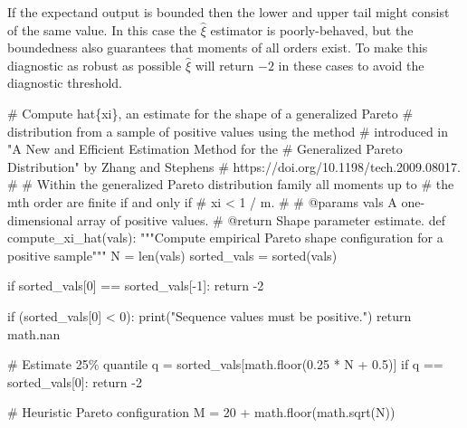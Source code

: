 \documentclass[
  letterpaper,
  DIV=11,
  numbers=noendperiod]{scrartcl}
\newenvironment{Shaded}{\begin{snugshade}}{\end{snugshade}}
\newcommand{\BuiltInTok}[1]{\textcolor[rgb]{0.00,0.23,0.31}{#1}}
\newcommand{\CommentTok}[1]{\textcolor[rgb]{0.37,0.37,0.37}{#1}}
\newcommand{\ControlFlowTok}[1]{\textcolor[rgb]{0.00,0.23,0.31}{#1}}
\newcommand{\DecValTok}[1]{\textcolor[rgb]{0.68,0.00,0.00}{#1}}
\newcommand{\FloatTok}[1]{\textcolor[rgb]{0.68,0.00,0.00}{#1}}
\newcommand{\KeywordTok}[1]{\textcolor[rgb]{0.00,0.23,0.31}{#1}}
\newcommand{\NormalTok}[1]{\textcolor[rgb]{0.00,0.23,0.31}{#1}}
\newcommand{\OperatorTok}[1]{\textcolor[rgb]{0.37,0.37,0.37}{#1}}
\newcommand{\StringTok}[1]{\textcolor[rgb]{0.13,0.47,0.30}{#1}}
\begin{document}
If the expectand output is bounded then the lower and upper tail might
consist of the same value. In this case the \(\hat{\xi}\) estimator is
poorly-behaved, but the boundedness also guarantees that moments of all
orders exist. To make this diagnostic as robust as possible
\(\hat{\xi}\) will return \(-2\) in these cases to avoid the diagnostic
threshold.

\begin{Shaded}
\begin{Highlighting}[]
\CommentTok{\# Compute hat\{xi\}, an estimate for the shape of a generalized Pareto}
\CommentTok{\# distribution from a sample of positive values using the method}
\CommentTok{\# introduced in "A New and Efficient Estimation Method for the}
\CommentTok{\# Generalized Pareto Distribution" by Zhang and Stephens}
\CommentTok{\# https://doi.org/10.1198/tech.2009.08017.}
\CommentTok{\#}
\CommentTok{\# Within the generalized Pareto distribution family all moments up to}
\CommentTok{\# the mth order are finite if and only if}
\CommentTok{\#  xi \textless{} 1 / m.}
\CommentTok{\#}
\CommentTok{\# @params vals A one{-}dimensional array of positive values.}
\CommentTok{\# @return Shape parameter estimate.}
\KeywordTok{def}\NormalTok{ compute\_xi\_hat(vals):}
  \CommentTok{"""Compute empirical Pareto shape configuration for a positive sample"""}
\NormalTok{  N }\OperatorTok{=} \BuiltInTok{len}\NormalTok{(vals)}
\NormalTok{  sorted\_vals }\OperatorTok{=} \BuiltInTok{sorted}\NormalTok{(vals)}

  \ControlFlowTok{if}\NormalTok{ sorted\_vals[}\DecValTok{0}\NormalTok{] }\OperatorTok{==}\NormalTok{ sorted\_vals[}\OperatorTok{{-}}\DecValTok{1}\NormalTok{]:}
    \ControlFlowTok{return} \OperatorTok{{-}}\DecValTok{2}

  \ControlFlowTok{if}\NormalTok{ (sorted\_vals[}\DecValTok{0}\NormalTok{] }\OperatorTok{\textless{}} \DecValTok{0}\NormalTok{):}
    \BuiltInTok{print}\NormalTok{(}\StringTok{"Sequence values must be positive."}\NormalTok{)}
    \ControlFlowTok{return}\NormalTok{ math.nan}

  \CommentTok{\# Estimate 25\% quantile}
\NormalTok{  q }\OperatorTok{=}\NormalTok{ sorted\_vals[math.floor(}\FloatTok{0.25} \OperatorTok{*}\NormalTok{ N }\OperatorTok{+} \FloatTok{0.5}\NormalTok{)]}
  \ControlFlowTok{if}\NormalTok{ q }\OperatorTok{==}\NormalTok{ sorted\_vals[}\DecValTok{0}\NormalTok{]:}
    \ControlFlowTok{return} \OperatorTok{{-}}\DecValTok{2}

  \CommentTok{\# Heuristic Pareto configuration}
\NormalTok{  M }\OperatorTok{=} \DecValTok{20} \OperatorTok{+}\NormalTok{ math.floor(math.sqrt(N))}


\end{Highlighting}
\end{Shaded}
\end{document}
